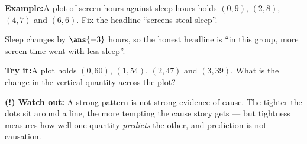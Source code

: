 \documentclass[12pt]{article}
\begin{document}
\begin{examplebox}
\textbf{Example:}\quad A plot of screen hours against sleep hours holds
$(0, 9)$, $(2, 8)$, $(4, 7)$ and $(6, 6)$. Fix the headline ``screens steal
sleep''.



Sleep changes by $\ans{-3}$ hours, so the honest headline is ``in this group,
more screen time went with less sleep''.
\end{examplebox}

\begin{tryitbox}
\textbf{Try it:}\quad A plot holds $(0, 60)$, $(1, 54)$, $(2, 47)$ and
$(3, 39)$. What is the change in the vertical quantity across the plot?

\end{tryitbox}

\begin{watchoutbox}
\textbf{(!) Watch out:} A strong pattern is not strong evidence of cause. The
tighter the dots sit around a line, the more tempting the cause story gets ---
but tightness measures how well one quantity \emph{predicts} the other, and
prediction is not causation.
\end{watchoutbox}
\end{document}
